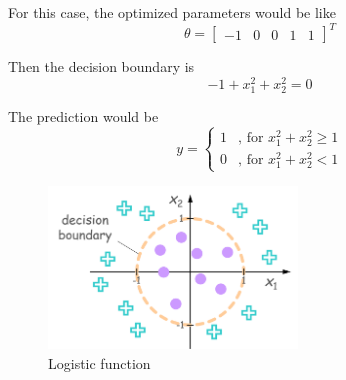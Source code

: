\begin{itemize}
    For this case, the optimized parameters would be like
    \begin{equation}
        \theta = 
        \left[\begin{array}{ccccc} -1 & 0 & 0 & 1 & 1 \end{array}\right]^T
    \end{equation}
    
    Then the decision boundary is
    \begin{equation}
        -1 + x_1^2 + x_2^2 = 0
    \end{equation}

    The prediction would be
    \begin{equation}
        y = \left\{\begin{aligned}
            1 &\text{, for } x_1^2 + x_2^2 \geq 1\\
            0 &\text{, for } x_1^2 + x_2^2 < 1
        \end{aligned}\right.
    \end{equation}

    \begin{figure}[!htbp]
        \centering
        \includegraphics[width=2.6in]{./images/decision boundary_nonlinear.png}
        \caption{Logistic function}
    \end{figure}
    
\end{itemize}
